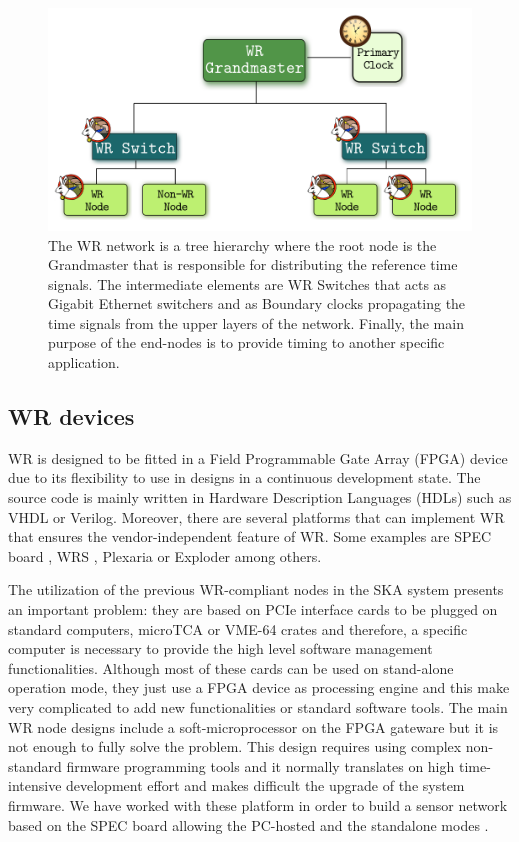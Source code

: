 \begin{figure}[H]
	\centering
	\includegraphics[scale=0.4]{img/wr_hierarchy}
	\caption{The WR network is a tree hierarchy where the root node is the Grandmaster that is responsible for distributing the reference time signals. The intermediate elements are WR Switches that acts as Gigabit Ethernet switchers and as Boundary clocks propagating the time signals from the upper layers of the network. Finally, the main purpose of the end-nodes is to provide timing to another specific application.}
	\label{fig:wr_hierarchy}
\end{figure}

\subsection{WR devices} 
\label{subsec:wr-dev}

WR is designed to be fitted in a Field Programmable Gate Array (FPGA) device due to its flexibility to use in designs in a continuous development state. The source code is mainly written in Hardware Description Languages (HDLs) such as VHDL or Verilog. Moreover, there are several platforms that can implement WR that ensures the vendor-independent feature of WR. Some examples are SPEC board \cite{ohwr:spec}, WRS \cite{ohwr:wrs}, Plexaria or Exploder \cite{cesar-altera-wr} among others. 


The utilization of the previous WR-compliant nodes in the SKA system presents an important problem: they are based on PCIe interface cards to be plugged on standard computers, microTCA or VME-64 crates and therefore, a specific computer is necessary to provide the high 
level software management functionalities. Although most of these cards can be used on stand-alone operation mode, they just use a FPGA device as processing engine and this make very complicated to add new functionalities or standard software tools. The main WR node designs include a soft-microprocessor on the FPGA gateware but it is not 
enough to fully solve the problem. This design requires using complex 
non-standard firmware programming tools and it normally translates on high time-intensive development effort and makes difficult the upgrade of the system firmware. We have worked with these platform in order to build a sensor network based on the SPEC board allowing the PC-hosted and the standalone modes \cite{migueljl-paper-wr-spec}.

